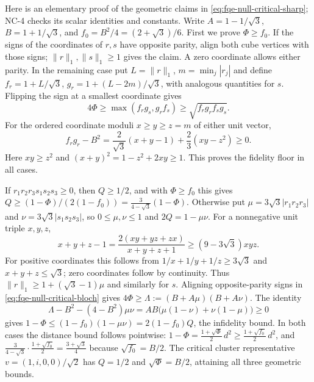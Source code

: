 Here is an elementary proof of the geometric claims in
\eqref{eq:fqe-null-critical-sharp}; NC-4 checks its scalar identities and constants.
Write $A=1-1/\sqrt3$, $B=1+1/\sqrt3$, and
$f_0=B^2/4=(2+\sqrt3)/6$.
First we prove $\Phi\ge f_0$. If the signs of the coordinates of
$r,s$ have opposite parity, align both cube vertices with those signs;
$\|r\|_1,\|s\|_1\ge1$ gives the claim. A zero coordinate allows either
parity. In the remaining case put $L=\|r\|_1$, $m=\min_j|r_j|$ and
define $f_r=1+L/\sqrt3$, $g_r=1+(L-2m)/\sqrt3$, with analogous
quantities for $s$. Flipping the sign at a smallest coordinate gives
\[
 4\Phi\ge\max(f_rg_s,g_rf_s)
                  \ge\sqrt{f_rg_rf_sg_s}.
\]
For the ordered coordinate moduli $x\ge y\ge z=m$ of either unit vector,
\[
 f_rg_r-B^2=\frac2{\sqrt3}(x+y-1)+\frac23(xy-z^2)\ge0.
\]
Here $xy\ge z^2$ and $(x+y)^2=1-z^2+2xy\ge1$.
This proves the fidelity floor in all cases.

If $r_1r_2r_3s_1s_2s_3\ge0$, then $Q\ge1/2$, and with $\Phi\ge f_0$ this gives
$Q\ge(1-\Phi)/(2(1-f_0))=\frac3{4-\sqrt3}(1-\Phi)$.
Otherwise put $\mu=3\sqrt3|r_1r_2r_3|$ and
$\nu=3\sqrt3|s_1s_2s_3|$, so $0\le\mu,\nu\le1$ and $2Q=1-\mu\nu$.
For a nonnegative unit triple $x,y,z$,
\[
 x+y+z-1
 =\frac{2(xy+yz+zx)}{x+y+z+1}
 \ge(9-3\sqrt3)xyz.
\]
For positive coordinates this follows from
$1/x+1/y+1/z\ge3\sqrt3$ and $x+y+z\le\sqrt3$;
zero coordinates follow by continuity.
Thus $\|r\|_1\ge1+(\sqrt3-1)\mu$ and similarly for $s$.
Aligning opposite-parity signs in \eqref{eq:fqe-null-critical-bloch} gives
$4\Phi\ge \Lambda:=(B+A\mu)(B+A\nu)$. The identity
\[
 \Lambda-B^2-(4-B^2)\mu\nu=AB\bigl(\mu(1-\nu)+\nu(1-\mu)\bigr)\ge0
\]
gives $1-\Phi\le(1-f_0)(1-\mu\nu)=2(1-f_0)Q$, the infidelity bound. In both cases the distance bound follows
pointwise: $1-\Phi=\frac{1+\sqrt\Phi}2\,d^2\ge\frac{1+\sqrt{f_0}}2\,d^2$, and
$\frac3{4-\sqrt3}\cdot\frac{1+\sqrt{f_0}}2=\frac{3+\sqrt3}4$ because $\sqrt{f_0}=B/2$.
The critical cluster representative $v=(1,i,0,0)/\sqrt2$ has
$Q=1/2$ and $\sqrt{\Phi}=B/2$, attaining all three geometric
bounds.



